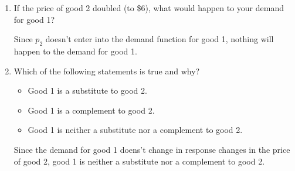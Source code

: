 \documentclass[12pt]{article}
\newcounter{question}[section]
\newenvironment{subquestions}{
  \begin{enumerate}[label=(\roman*)]}{\end{enumerate}}
\begin{document}
\begin{subquestions}
    \textcolor{solution-color}{
      Using these numbers in the demand functions:
      \begin{align*}
        x_1&= \frac{m}{4p_1} = \frac{120}{4\times 1}=30\\
        x_2&= \frac{3m}{4p_2} = \frac{3\times 120}{4\times 3} = 30
      \end{align*}
    }
  \item If the price of good 2 doubled (to \$6), what would happen to your
    demand for good 1?

    \textcolor{solution-color}{
      Since $p_2$ doesn't enter into the demand function for good 1, nothing
      will happen to the demand for good 1.
    }
  \item Which of the following statements is true and why?
    \begin{itemize}
      \item Good 1 is a substitute to good 2.
      \item Good 1 is a complement to good 2.
      \item Good 1 is neither a substitute nor a complement to good 2.
    \end{itemize}

    \textcolor{solution-color}{
      Since the demand for good 1 doens't change in response changes in the
      price of good 2, good 1 is neither a substitute nor a complement to good
      2.
    }
\end{subquestions}
\end{document}

